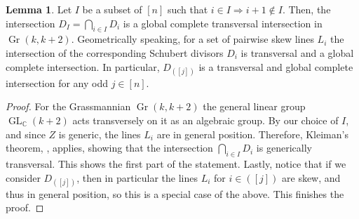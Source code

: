 \documentclass[12pt]{extarticle}
\theoremstyle{definition}
\theoremstyle{theorem}
\newtheorem{lemma}[definition]{Lemma}
\theoremstyle{remark}
\numberwithin{equation}{section}
\newcommand{\C}{\mathbb{C}}
\newcommand{\grk}{\operatorname{Gr}(k,k+2)}
\newcommand{\odd}[1]{([#1])}
\begin{document}
\begin{lemma}\label{lem:Kleimann}
    Let $I$ be a subset of $[n]$ such that $i\in I\Rightarrow i+1\notin I$.
    Then, the intersection $D_I=\bigcap_{i\in I}D_i$ is a global complete transversal intersection in $\grk$.
    Geometrically speaking, for a set of pairwise skew lines $L_i$ the intersection of the corresponding Schubert divisors $D_i$ is transversal and a global complete  intersection.
    In particular, $D_{\odd j}$ is a transversal and global complete intersection for any odd $j\in [n]$.
\end{lemma}
\begin{proof}
    For the Grassmannian $\grk$ the general linear group $\operatorname{GL}_{\C}(k+2)$ acts transversely on it as an algebraic group.
    By our choice of $I$, and since $Z$ is generic, the lines $L_i$ are in general position.
    Therefore, Kleiman's theorem, \cite[Theorem 1.3]{3264andallthat}, applies, showing that the intersection $\bigcap_{i\in I}D_i$ is generically transversal. This shows the first part of the statement.
    Lastly, notice that if we consider $D_{\odd j}$, then in particular the lines $L_i$ for $i\in([j])$ are skew, and thus in general position, so this is a special case of the above.
    This finishes the proof.
\end{proof}
\end{document}

